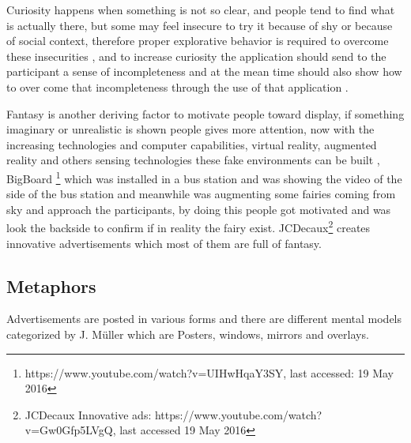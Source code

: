 Curiosity happens when something is not so clear, and people tend to find what is actually there, but some may feel insecure to try it because of shy or because of social context, therefore proper explorative behavior is required to overcome these insecurities \cite{motiv}, and to increase curiosity the application should send to the participant a sense of incompleteness and at the mean time should also show how to over come that incompleteness through the use of that application \cite{pervasiv_ad}.

Fantasy is another deriving factor to motivate people toward display, if something imaginary or unrealistic is shown people gives more attention, now with the increasing technologies and computer capabilities, virtual reality, augmented reality and others sensing technologies these fake environments can be built \cite{fantasy_metaphores}, BigBoard \footnote{ https://www.youtube.com/watch?v=UIHwHqaY3SY, last accessed: 19 May 2016} which was installed in a bus station and was showing the video of the side of the bus station and meanwhile was augmenting some fairies coming from sky and approach the participants, by doing this people got motivated and was look the backside to confirm if in reality the fairy exist. JCDecaux\footnote{JCDecaux Innovative ads: https://www.youtube.com/watch?v=Gw0Gfp5LVgQ, last accessed 19 May 2016} creates innovative advertisements which most of them are full of fantasy. 



\subsection{Metaphors}
Advertisements are posted in various forms and there are different mental models categorized by J. Müller \cite{DesignSpace} which are Posters, windows, mirrors and overlays.

